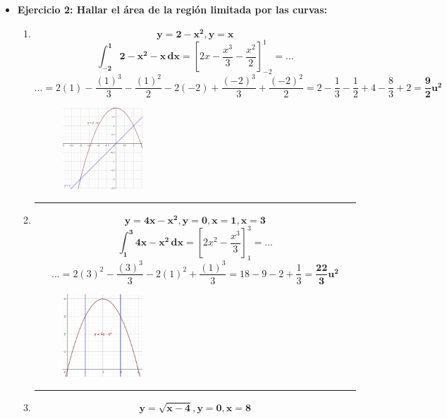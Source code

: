 \documentclass[12pt]{article}
\begin{document}
\begin{itemize}
        \newpage
        \item \textbf{Ejercicio 2: Hallar el área de la región limitada por las curvas:}\vspace{0.5cm}
            \begin{enumerate}
                \hrule
                \item \[\bm{y = 2 - x^2, y = x}\]
                    \[\bm{\int_{-2}^{1} 2 - x^2 - x \, dx} = \left[2x - \frac{x^3}{3} - \frac{x^2}{2}\right]_{-2}^{1} = ...\]
                    \[... = 2(1) - \frac{(1)^3}{3} - \frac{(1)^2}{2} - 2(-2) + \frac{(-2)^3}{3} + \frac{(-2)^2}{2} = 2 -\frac{1}{3} - \frac{1}{2} + 4 - \frac{8}{3} + 2 = \bm{\frac{9}{2}u^2}\]
                    \begin{figure}[h!]
                        \centering
                        \includegraphics[width=0.3\textwidth]{img/t6-ej2-1.png}
                    \end{figure}
            
                \hrule
                \item \[\bm{y = 4x - x^2, y = 0, x = 1, x = 3}\]
                    \[\bm{\int_{1}^{3} 4x - x^2 \, dx} = \left[2x^2 - \frac{x^3}{3}\right]_{1}^{3} = ...\]
                    \[... = 2(3)^2 - \frac{(3)^3}{3} - 2(1)^2 + \frac{(1)^3}{3} = 18 - 9 - 2 +\frac{1}{3} = \bm{\frac{22}{3}u^2}\]
                    \begin{figure}[h!]
                        \centering
                        \includegraphics[width=0.3\textwidth]{img/t6-ej2-2.png}
                    \end{figure}


                \hrule
                \item \[\bm{y = \sqrt{x - 4}, y = 0, x = 8}\]
            

\end{enumerate}
\end{itemize}
\end{document}
